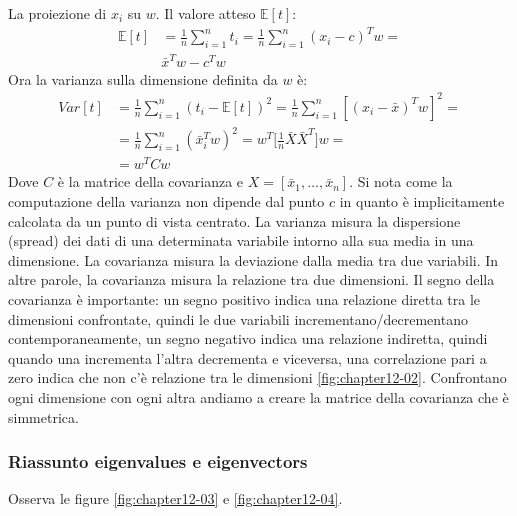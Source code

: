 		La proiezione di $x_i$ su $w$.
		Il valore atteso $\mathbb{E}[t]$:
		\begin{align*}
			\mathbb{E}[t] &= \frac{1}{n}\sum\limits_{i=1}^nt_i = \frac{1}{n}\sum\limits_{i=1}^n(x_i-c)^Tw=\\
			&\bar{x}^Tw-c^Tw
		\end{align*}
		Ora la varianza sulla dimensione definita da $w$ \`e:
		\begin{align*}
			Var[t] &= \frac{1}{n}\sum\limits_{i = 1}^n(t_i -\mathbb{E}[t])^2 = \frac{1}{n}\sum\limits_{i=1}^n[(x_i-\bar{x})^Tw]^2=\\
			&=\frac{1}{n}\sum\limits_{i=1}^n(\bar{x}_i^Tw)^2 = w^T\bigl[\frac{1}{n}\bar{X}\bar{X}^T\bigr]w=\\
			&=w^TCw
		\end{align*}
		Dove $C$ \`e la matrice della covarianza e $X = [\bar{x}_1,\dots,\bar{x}_n]$.
		Si nota come la computazione della varianza non dipende dal punto $c$ in quanto \`e implicitamente calcolata da un punto di vista centrato. 
		La varianza misura la dispersione (spread) dei dati di una determinata variabile intorno alla sua media in una dimensione. 
		La covarianza misura la deviazione dalla media tra due variabili. 
		In altre parole, la covarianza misura la relazione tra due dimensioni. 
		Il segno della covarianza \`e importante: un segno positivo indica una relazione diretta tra le dimensioni confrontate, quindi le due variabili incrementano/decrementano contemporaneamente, un segno negativo indica una relazione indiretta, quindi quando una incrementa l'altra decrementa e viceversa, una correlazione pari a zero indica che non c'\`e relazione tra le dimensioni  \ref{fig:chapter12-02}.
		Confrontano ogni dimensione con ogni altra andiamo a creare la matrice della covarianza che \`e simmetrica.
		
		\subsubsection{Riassunto eigenvalues e eigenvectors}
		
		Osserva le figure \ref{fig:chapter12-03} e \ref{fig:chapter12-04}.
		
